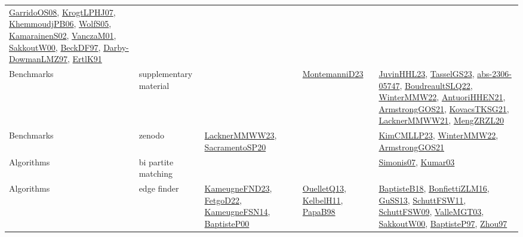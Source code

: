 {\begin{longtable}{lp{3cm}>{\raggedright}p{6cm}>{\raggedright}p{6cm}p{8cm}}
\href{articles/GarridoOS08.pdf}{GarridoOS08}\cite{GarridoOS08}, \href{papers/KrogtLPHJ07.pdf}{KrogtLPHJ07}\cite{KrogtLPHJ07}, \href{papers/KhemmoudjPB06.pdf}{KhemmoudjPB06}\cite{KhemmoudjPB06}, \href{papers/WolfS05.pdf}{WolfS05}\cite{WolfS05}, \href{papers/KamarainenS02.pdf}{KamarainenS02}\cite{KamarainenS02}, \href{papers/VanczaM01.pdf}{VanczaM01}\cite{VanczaM01}, \href{articles/SakkoutW00.pdf}{SakkoutW00}\cite{SakkoutW00}, \href{papers/BeckDF97.pdf}{BeckDF97}\cite{BeckDF97}, \href{articles/Darby-DowmanLMZ97.pdf}{Darby-DowmanLMZ97}\cite{Darby-DowmanLMZ97}, \href{papers/ErtlK91.pdf}{ErtlK91}\cite{ErtlK91}\\
Benchmarks & supplementary material &  & \href{articles/MontemanniD23.pdf}{MontemanniD23}\cite{MontemanniD23} & \href{papers/JuvinHHL23.pdf}{JuvinHHL23}\cite{JuvinHHL23}, \href{papers/TasselGS23.pdf}{TasselGS23}\cite{TasselGS23}, \href{articles/abs-2306-05747.pdf}{abs-2306-05747}\cite{abs-2306-05747}, \href{papers/BoudreaultSLQ22.pdf}{BoudreaultSLQ22}\cite{BoudreaultSLQ22}, \href{papers/WinterMMW22.pdf}{WinterMMW22}\cite{WinterMMW22}, \href{papers/AntuoriHHEN21.pdf}{AntuoriHHEN21}\cite{AntuoriHHEN21}, \href{papers/ArmstrongGOS21.pdf}{ArmstrongGOS21}\cite{ArmstrongGOS21}, \href{papers/KovacsTKSG21.pdf}{KovacsTKSG21}\cite{KovacsTKSG21}, \href{papers/LacknerMMWW21.pdf}{LacknerMMWW21}\cite{LacknerMMWW21}, \href{articles/MengZRZL20.pdf}{MengZRZL20}\cite{MengZRZL20}\\
Benchmarks & zenodo & \href{articles/LacknerMMWW23.pdf}{LacknerMMWW23}\cite{LacknerMMWW23}, \href{articles/SacramentoSP20.pdf}{SacramentoSP20}\cite{SacramentoSP20} &  & \href{papers/KimCMLLP23.pdf}{KimCMLLP23}\cite{KimCMLLP23}, \href{papers/WinterMMW22.pdf}{WinterMMW22}\cite{WinterMMW22}, \href{papers/ArmstrongGOS21.pdf}{ArmstrongGOS21}\cite{ArmstrongGOS21}\\
Algorithms & bi partite matching &  &  & \href{articles/Simonis07.pdf}{Simonis07}\cite{Simonis07}, \href{papers/Kumar03.pdf}{Kumar03}\cite{Kumar03}\\
Algorithms & edge finder & \href{papers/KameugneFND23.pdf}{KameugneFND23}\cite{KameugneFND23}, \href{articles/FetgoD22.pdf}{FetgoD22}\cite{FetgoD22}, \href{articles/KameugneFSN14.pdf}{KameugneFSN14}\cite{KameugneFSN14}, \href{articles/BaptisteP00.pdf}{BaptisteP00}\cite{BaptisteP00} & \href{papers/OuelletQ13.pdf}{OuelletQ13}\cite{OuelletQ13}, \href{articles/KelbelH11.pdf}{KelbelH11}\cite{KelbelH11}, \href{articles/PapaB98.pdf}{PapaB98}\cite{PapaB98} & \href{articles/BaptisteB18.pdf}{BaptisteB18}\cite{BaptisteB18}, \href{papers/BonfiettiZLM16.pdf}{BonfiettiZLM16}\cite{BonfiettiZLM16}, \href{papers/GuSS13.pdf}{GuSS13}\cite{GuSS13}, \href{articles/SchuttFSW11.pdf}{SchuttFSW11}\cite{SchuttFSW11}, \href{papers/SchuttFSW09.pdf}{SchuttFSW09}\cite{SchuttFSW09}, \href{papers/ValleMGT03.pdf}{ValleMGT03}\cite{ValleMGT03}, \href{articles/SakkoutW00.pdf}{SakkoutW00}\cite{SakkoutW00}, \href{papers/BaptisteP97.pdf}{BaptisteP97}\cite{BaptisteP97}, \href{articles/Zhou97.pdf}{Zhou97}\cite{Zhou97}\\

\end{longtable}}
